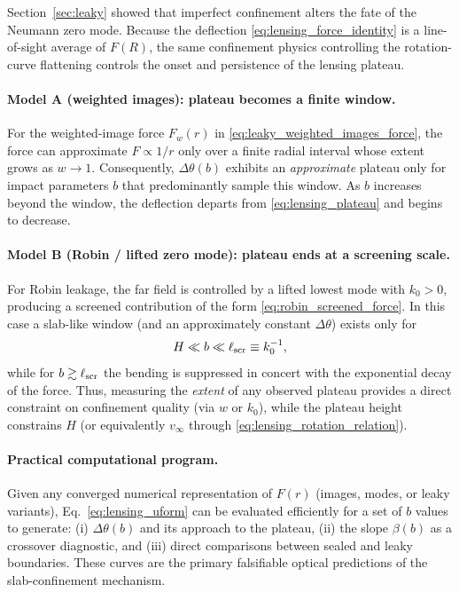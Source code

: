 \documentclass[11pt]{article}
\begin{document}
Section~\ref{sec:leaky} showed that imperfect confinement alters the fate of the Neumann zero mode.
Because the deflection \eqref{eq:lensing_force_identity} is a line-of-sight average of $F(R)$, the
same confinement physics controlling the rotation-curve flattening controls the onset and
persistence of the lensing plateau.

\paragraph{Model A (weighted images): plateau becomes a finite window.}
For the weighted-image force $F_w(r)$ in \eqref{eq:leaky_weighted_images_force}, the force can
approximate $F\propto 1/r$ only over a finite radial interval whose extent grows as $w\to 1$.
Consequently, $\Delta\theta(b)$ exhibits an \emph{approximate} plateau only for impact parameters
$b$ that predominantly sample this window.  As $b$ increases beyond the window, the deflection
departs from \eqref{eq:lensing_plateau} and begins to decrease.

\paragraph{Model B (Robin / lifted zero mode): plateau ends at a screening scale.}
For Robin leakage, the far field is controlled by a lifted lowest mode with $k_0>0$, producing a
screened contribution of the form \eqref{eq:robin_screened_force}.  In this case a slab-like window
(and an approximately constant $\Delta\theta$) exists only for
\begin{equation}
  H \ll b \ll \ell_{\rm scr}\equiv k_0^{-1},
\end{equation}
while for $b\gtrsim \ell_{\rm scr}$ the bending is suppressed in concert with the exponential decay
of the force.  Thus, measuring the \emph{extent} of any observed plateau provides a direct constraint
on confinement quality (via $w$ or $k_0$), while the plateau height constrains $H$ (or equivalently
$v_\infty$ through \eqref{eq:lensing_rotation_relation}).

\paragraph{Practical computational program.}
Given any converged numerical representation of $F(r)$ (images, modes, or leaky variants),
Eq.~\eqref{eq:lensing_uform} can be evaluated efficiently for a set of $b$ values to generate:
(i) $\Delta\theta(b)$ and its approach to the plateau,
(ii) the slope $\beta(b)$ as a crossover diagnostic, and
(iii) direct comparisons between sealed and leaky boundaries.
These curves are the primary falsifiable optical predictions of the slab-confinement mechanism.
\end{document}
